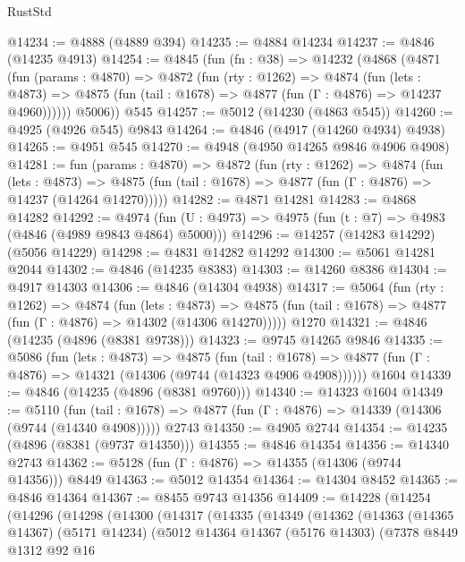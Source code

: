 \begin{lexlean}{RustStd}
\begin{coremodule}
@14234 := @4888 (@4889 @394)
@14235 := @4884 @14234
@14237 := @4846 (@14235 @4913)
@14254 := @4845
    (fun (fn : @38) =>
    @14232
      (@4868
        (@4871
          (fun (params : @4870) =>
          @4872
            (fun (rty : @1262) =>
            @4874
              (fun (lets : @4873) =>
              @4875 (fun (tail : @1678) => @4877 (fun (Γ : @4876) => @14237 @4960))))))
        @5006))
    @545
@14257 := @5012 (@14230 (@4863 @545))
@14260 := @4925 (@4926 @545) @9843
@14264 := @4846 (@4917 (@14260 @4934) @4938)
@14265 := @4951 @545
@14270 := @4948 (@4950 @14265 @9846 @4906 @4908)
@14281 := fun (params : @4870) =>
  @4872
    (fun (rty : @1262) =>
    @4874
      (fun (lets : @4873) =>
      @4875 (fun (tail : @1678) => @4877 (fun (Γ : @4876) => @14237 (@14264 @14270)))))
@14282 := @4871 @14281
@14283 := @4868 @14282
@14292 := @4974 (fun (U : @4973) => @4975 (fun (t : @7) => @4983 (@4846 (@4989 @9843 @4864) @5000)))
@14296 := @14257 (@14283 @14292) (@5056 @14229)
@14298 := @4831 @14282 @14292
@14300 := @5061 @14281 @2044
@14302 := @4846 (@14235 @8383)
@14303 := @14260 @8386
@14304 := @4917 @14303
@14306 := @4846 (@14304 @4938)
@14317 := @5064
    (fun (rty : @1262) =>
    @4874
      (fun (lets : @4873) =>
      @4875 (fun (tail : @1678) => @4877 (fun (Γ : @4876) => @14302 (@14306 @14270)))))
    @1270
@14321 := @4846 (@14235 (@4896 (@8381 @9738)))
@14323 := @9745 @14265 @9846
@14335 := @5086
    (fun (lets : @4873) =>
    @4875
      (fun (tail : @1678) =>
      @4877 (fun (Γ : @4876) => @14321 (@14306 (@9744 (@14323 @4906 @4908))))))
    @1604
@14339 := @4846 (@14235 (@4896 (@8381 @9760)))
@14340 := @14323 @1604
@14349 := @5110
    (fun (tail : @1678) => @4877 (fun (Γ : @4876) => @14339 (@14306 (@9744 (@14340 @4908)))))
    @2743
@14350 := @4905 @2744
@14354 := @14235 (@4896 (@8381 (@9737 @14350)))
@14355 := @4846 @14354
@14356 := @14340 @2743
@14362 := @5128 (fun (Γ : @4876) => @14355 (@14306 (@9744 @14356))) @8449
@14363 := @5012 @14354
@14364 := @14304 @8452
@14365 := @4846 @14364
@14367 := @8455 @9743 @14356
@14409 := @14228
    (@14254
      (@14296
        (@14298
          (@14300
            (@14317
              (@14335
                (@14349
                  (@14362
                    (@14363
                      (@14365 @14367)
                      (@5171 @14234)
                      (@5012
                        @14364
                        @14367
                        (@5176 @14303)
                        (@7378
                          @8449
                          @1312
                          @92
                          @16

\end{coremodule}
\end{lexlean}
